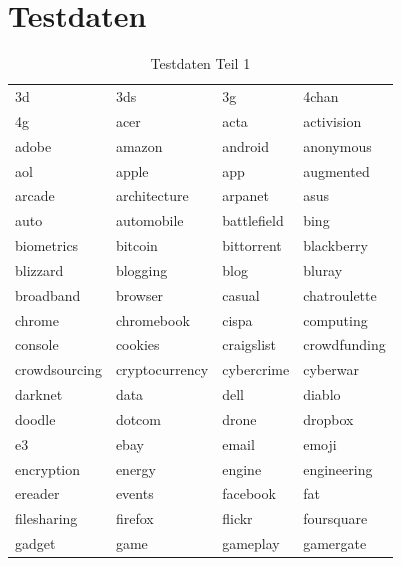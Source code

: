 \documentclass[12pt,a4paper]{report}
\begin{document}
	\section{Testdaten}
	\label{sec:Testdaten}
\begin{table}[ht]
\caption{Testdaten Teil 1}
\begin{tabular}{l|l|l|l}\\
3d & 3ds & 3g & 4chan\\
4g & acer & acta & activision\\
adobe & amazon & android & anonymous\\
aol & apple & app & augmented\\
arcade & architecture & arpanet & asus\\
auto & automobile & battlefield & bing\\
biometrics & bitcoin & bittorrent & blackberry\\
blizzard & blogging & blog & bluray\\
broadband & browser & casual & chatroulette\\
chrome & chromebook & cispa & computing\\
console & cookies & craigslist & crowdfunding\\
crowdsourcing & cryptocurrency & cybercrime & cyberwar\\
darknet & data & dell & diablo\\
doodle & dotcom & drone & dropbox\\
e3 & ebay & email & emoji\\
encryption & energy & engine & engineering\\
ereader & events & facebook & fat\\
filesharing & firefox & flickr & foursquare\\
gadget & game & gameplay & gamergate\\

\end{tabular}
\end{table}
\end{document}
